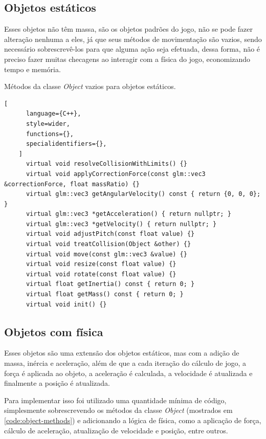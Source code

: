 \subsection{Objetos estáticos}

Esses objetos não têm massa, são os objetos padrões do jogo, não se pode fazer alteração nenhuma a eles, já que seus métodos de movimentação são vazios, sendo necessário sobrescrevê-los para que alguma ação seja efetuada, dessa forma, não é preciso fazer muitas checagens ao interagir com a física do jogo, economizando tempo e memória.

\begin{programruledcaption}{Métodos da classe \textit{Object} vazios para objetos estáticos.\label{prog:mdc}}
    \begin{lstlisting}[
      language={C++},
      style=wider,
      functions={},
      specialidentifiers={},
    ]
      virtual void resolveCollisionWithLimits() {}
      virtual void applyCorrectionForce(const glm::vec3 &correctionForce, float massRatio) {}
      virtual glm::vec3 getAngularVelocity() const { return {0, 0, 0}; }
      virtual glm::vec3 *getAcceleration() { return nullptr; }
      virtual glm::vec3 *getVelocity() { return nullptr; }
      virtual void adjustPitch(const float value) {}
      virtual void treatCollision(Object &other) {}
      virtual void move(const glm::vec3 &value) {}
      virtual void resize(const float value) {}
      virtual void rotate(const float value) {}
      virtual float getInertia() const { return 0; }
      virtual float getMass() const { return 0; }
      virtual void init() {}
    \end{lstlisting}
\end{programruledcaption}

\subsection{Objetos com física}

Esses objetos são uma extensão dos objetos estáticos, mas com a adição de massa, inércia e aceleração, além de que a cada iteração do cálculo de jogo, a força é aplicada ao objeto, a aceleração é calculada, a velocidade é atualizada e finalmente a posição é atualizada.

Para implementar isso foi utilizado uma quantidade mínima de código, simplesmente sobrescrevendo os métodos da classe \textit{Object} (mostrados em \ref{code:object-methods}) e adicionando a lógica de física, como a aplicação de força, cálculo de aceleração, atualização de velocidade e posição, entre outros.

